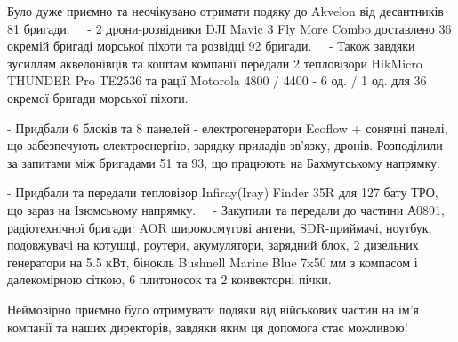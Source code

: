 Було дуже приємно та неочікувано отримати подяку до Akvelon від десантників 81
бригади.
⠀
- 2 дрони-розвідники DJI Mavic 3 Fly More Combo доставлено 36 окремій бригаді
морської піхоти та розвідці 92 бригади.
⠀
- Також завдяки зусиллям аквелонівців та коштам компанії передали 2 тепловізори
HikMicro THUNDER Pro TE2536 та рації Motorola 4800 / 4400 - 6 од. / 1 од. для
36 окремої бригади морської піхоти.

- Придбали 6 блоків та 8 панелей - електрогенератори Ecoflow + сонячні панелі,
що забезпечують електроенергію, зарядку приладів зв'язку, дронів. Розподілили
за запитами між бригадами 51 та 93, що працюють на Бахмутському напрямку.  ⠀

- Придбали та передали тепловізор Infiray(Iray) Finder 35R для 127 бату ТРО, що
зараз на Ізюмському напрямку.
⠀
- Закупили та передали до частини А0891, радіотехнічної бригади: AOR
широкосмугові антени, SDR-приймачі, ноутбук, подовжувачі на котушці, роутери,
акумулятори, зарядний блок, 2 дизельних генератори на 5.5 кВт, бінокль Bushnell
Marine Blue 7x50 мм з компасом і далекомірною сіткою, 6 плитоносок та 2
конвекторні пічки.  ⠀

Неймовірно приємно було отримувати подяки від військових частин на ім'я
компанії та наших директорів, завдяки яким ця допомога стає можливою!
